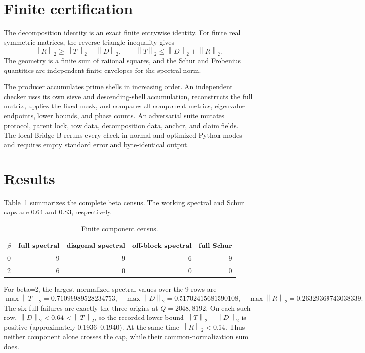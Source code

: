 \documentclass[10pt]{article}
\newcommand{\opnorm}[1]{\left\lVert #1\right\rVert_2}
\begin{document}
\section{Finite certification}

The decomposition identity is an exact finite entrywise identity.  For finite
real symmetric matrices, the reverse triangle inequality gives
\[
 \opnorm{R}\geq \opnorm{T}-\opnorm{D},
 \qquad
 \opnorm{T}\leq\opnorm{D}+\opnorm{R}.
\]
The geometry is a finite sum of rational squares, and the Schur and Frobenius
quantities are independent finite envelopes for the spectral norm.

The producer accumulates prime shells in increasing order.  An independent
checker uses its own sieve and descending-shell accumulation, reconstructs the
full matrix, applies the fixed mask, and compares all component metrics,
eigenvalue endpoints, lower bounds, and phase counts.  An adversarial suite
mutates protocol, parent lock, row data, decomposition data, anchor, and
claim fields.  The local Bridge-B reruns every check in normal and optimized
Python modes and requires empty standard error and byte-identical output.

\section{Results}

Table~\ref{tab:components} summarizes the complete beta census.  The working
spectral and Schur caps are 0.64 and 0.83, respectively.

\begin{table}[h]
\centering
\caption{Finite component census.}
\label{tab:components}
\begin{tabular}{@{}lrrrr@{}}
\toprule
\(\beta\) & full spectral & diagonal spectral & off-block spectral & full Schur\\
\midrule
0 & 9 & 9 & 6 & 9\\
2 & 6 & 0 & 0 & 0\\
\bottomrule
\end{tabular}
\end{table}

For beta=2, the largest normalized spectral values over the 9 rows are
\[
 \max\opnorm{T}=0.71099989528234753,\quad
 \max\opnorm{D}=0.51702415681590108,\quad
 \max\opnorm{R}=0.26329369743038339.
\]
The six full failures are exactly the three origins at \(Q=2048,8192\).
On each such row, \(\opnorm{D}<0.64<\opnorm{T}\), so the recorded lower bound
\(\opnorm{T}-\opnorm{D}\) is positive (approximately 0.1936--0.1940).
At the same time \(\opnorm{R}<0.64\).  Thus neither component alone crosses
the cap, while their common-normalization sum does.
\end{document}
